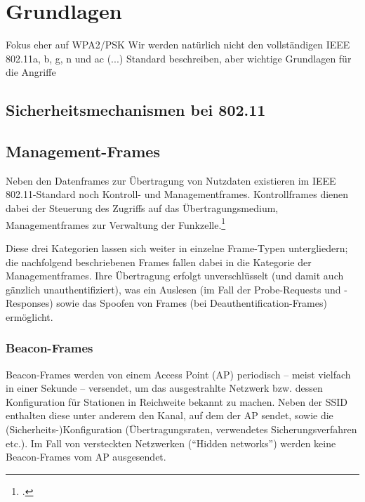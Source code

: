 \section{Grundlagen}\label{sec:grundlagen}
Fokus eher auf WPA2/PSK
Wir werden natürlich nicht den vollständigen IEEE 802.11a, b, g, n und ac (...) Standard beschreiben, aber wichtige Grundlagen für die Angriffe
\subsection{Sicherheitsmechanismen bei 802.11}

\subsection{Management-Frames}
Neben den Datenframes zur Übertragung von Nutzdaten existieren im IEEE 802.11-Standard noch Kontroll- und Managementframes. Kontrollframes dienen dabei der Steuerung des Zugriffs auf das Übertragungsmedium, Managementframes zur Verwaltung der Funkzelle.\footcite[S. 180]{rechWLAN}

Diese drei Kategorien lassen sich weiter in einzelne Frame-Typen untergliedern; die nachfolgend beschriebenen Frames fallen dabei in die Kategorie der Managementframes. Ihre Übertragung erfolgt unverschlüsselt (und damit auch gänzlich unauthentifiziert), was ein Auslesen (im Fall der Probe-Requests und -Responses) sowie das Spoofen von Frames (bei Deauthentification-Frames) ermöglicht.

\subsubsection{Beacon-Frames}
Beacon-Frames werden von einem Access Point (AP) periodisch -- meist vielfach in einer Sekunde -- versendet, um das ausgestrahlte Netzwerk bzw. dessen Konfiguration für Stationen in Reichweite bekannt zu machen. Neben der SSID enthalten diese unter anderem den Kanal, auf dem der AP sendet, sowie die (Sicherheits-)Konfiguration (Übertragungsraten, verwendetes Sicherungsverfahren etc.). Im Fall von versteckten Netzwerken (\enquote{Hidden networks}) werden keine Beacon-Frames vom AP ausgesendet.

